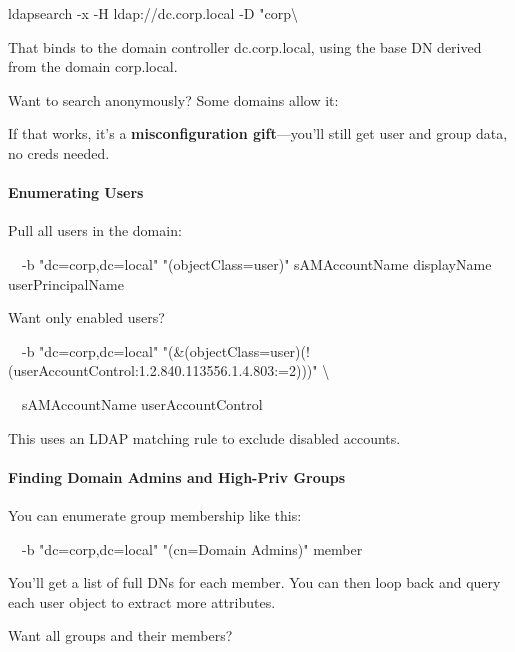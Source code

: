 ldapsearch -x -H ldap://dc.corp.local -D "corp\textbackslash{}%

That binds to the domain controller dc.corp.local, using the base DN derived from the domain corp.local.

Want to search anonymously? Some domains allow it:


If that works, it’s a \textbf{misconfiguration gift}—you’ll still get user and group data, no creds needed.

\paragraph{\textbf{Enumerating Users}}

Pull all users in the domain:


  -b "dc=corp,dc=local" "(objectClass=user)" sAMAccountName displayName userPrincipalName

Want only enabled users?


  -b "dc=corp,dc=local" "(\&(objectClass=user)(!(userAccountControl:1.2.840.113556.1.4.803:=2)))" \textbackslash{}

  sAMAccountName userAccountControl

This uses an LDAP matching rule to exclude disabled accounts.

\paragraph{\textbf{   Finding Domain Admins and High-Priv Groups}}

You can enumerate group membership like this:


  -b "dc=corp,dc=local" "(cn=Domain Admins)" member

You’ll get a list of full DNs for each member. You can then loop back and query each user object to extract more attributes.

Want all groups and their members?

